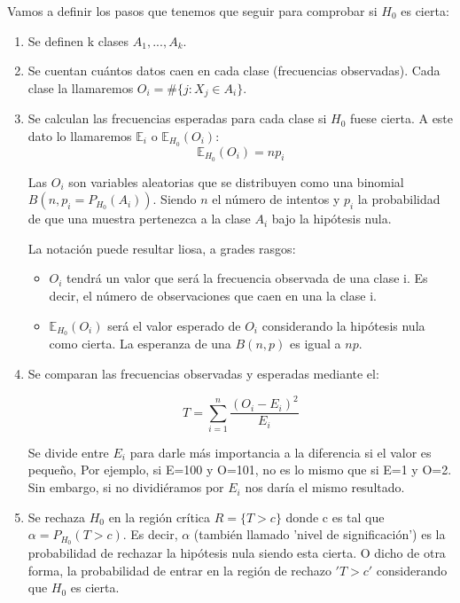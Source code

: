 \documentclass[nochap]{apuntes}
\begin{document}
Vamos a definir los pasos que tenemos que seguir para comprobar si $H_0$ es cierta:
\begin{enumerate}
\item Se definen k clases $A_1,...,A_k$. 

\item Se cuentan cuántos datos caen en cada clase (frecuencias observadas). Cada clase la llamaremos $O_i=\#\{j:X_j\in A_i\}$.

\item Se calculan las frecuencias esperadas para cada clase si $H_0$ fuese cierta. A este dato lo llamaremos $\mathbb{E}_i$ o $\mathbb{E}_{H_0}(O_i)$: 
\[
\mathbb{E}_{H_0}(O_i) = np_i
\]

\obs Las $O_i$ son variables aleatorias que se distribuyen como una binomial $B(n, p_i=P_{H_0}(A_i))$. Siendo $n$ el número de intentos y $p_i$ la probabilidad de que una muestra pertenezca a la clase $A_i$ bajo la hipótesis nula. 

La notación puede resultar liosa, a grades rasgos:
\begin{itemize}
\item $O_i$ tendrá un valor que será la frecuencia observada de una clase i. Es decir, el número de observaciones que caen en una la clase i.
\item $\mathbb{E}_{H_0}(O_i)$ será el valor esperado de $O_i$ considerando la hipótesis nula como cierta. La esperanza de una $B(n,p)$ es igual a $np$.
\end{itemize}

\item Se comparan las frecuencias observadas y esperadas mediante el:

\begin{defn}
\[T = \sum_{i=1}^n \frac{(O_i-E_i)^2}{E_i}\]
\end{defn}

Se divide entre $E_i$ para darle más importancia a la diferencia si el valor es pequeño, Por ejemplo, si E=100 y O=101, no es lo mismo que si E=1 y O=2. Sin embargo, si no dividiéramos por $E_i$ nos daría el mismo resultado.

\item Se rechaza $H_0$ en la región crítica $R=\{T > c\}$ donde c es tal que $\alpha=P_{H_0}(T>c)$. Es decir, $\alpha$ (también llamado 'nivel de significación') es la probabilidad de rechazar la hipótesis nula siendo esta cierta. O dicho de otra forma, la probabilidad de entrar en la región de rechazo $'T>c'$ considerando que $H_0$ es cierta.
\end{enumerate}
\end{document}

